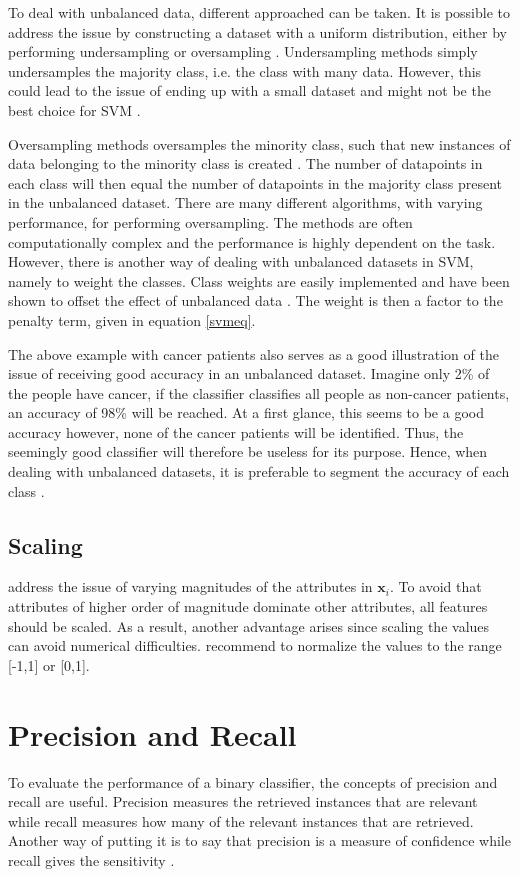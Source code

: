 To deal with unbalanced data, different approached can be taken. It is possible to address the issue by constructing a dataset with a uniform distribution, either by performing undersampling or oversampling \citep{delRio2014}. Undersampling methods simply undersamples the majority class, i.e. the class with many data. However, this could lead to the issue of ending up with a small dataset and might not be the best choice for SVM \citep{Akbani2004}. 

Oversampling methods oversamples the minority class, such that new instances of data belonging to the minority class is created \citep{delRio2014,Akbani2004}. The number of datapoints in each class will then equal the number of datapoints in the majority class present in the unbalanced dataset. There are many different algorithms, with varying performance, for performing oversampling. The methods are often computationally complex and the performance is highly dependent on the task. However, there is another way of dealing with unbalanced datasets in SVM, namely to weight the classes. Class weights are easily implemented and have been shown to offset the effect of unbalanced data \citep{Akbani2004}. The weight is then a factor to the penalty term, given in equation \eqref{svmeq}.

The above example with cancer patients also serves as a good illustration of the issue of receiving good accuracy in an unbalanced dataset. Imagine only 2\% of the people have cancer, if the classifier classifies all people as non-cancer patients, an accuracy of 98\% will be reached. At a first glance, this seems to be a good accuracy however, none of the cancer patients will be identified. Thus, the seemingly good classifier will therefore be useless for its purpose. Hence, when dealing with unbalanced datasets, it is preferable to segment the accuracy of each class \citep{delRio2014}. 

\subsection{Scaling \label{scale}}
\citet{Hsu10apractical} address the issue of varying magnitudes of the attributes in $\bm{x}_i$. To avoid that attributes of higher order of magnitude dominate other attributes, all features should be scaled. As a result, another advantage arises since scaling the values can avoid numerical difficulties. \citet{Hsu10apractical} recommend to normalize the values to the range [-1,1] or [0,1].

\section{Precision and Recall}
To evaluate the performance of a binary classifier, the concepts of precision and recall are useful. Precision measures the retrieved instances that are relevant while recall measures how many of the relevant instances that are retrieved. Another way of putting it is to say that precision is a measure of confidence while recall gives the sensitivity \citep{powers2011}.

